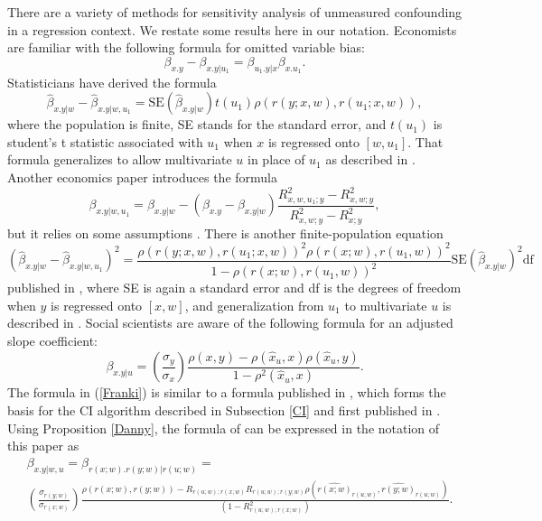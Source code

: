\documentclass[11pt]{amsart}
\begin{document}
There are a variety of methods for sensitivity analysis of unmeasured confounding in a regression context. We restate some results here in our notation. Economists are familiar \citep{Angrist2009} with the following formula for omitted variable bias: \begin{equation}\label{simple}\beta_{x.y}-\beta_{x.y|u_1}=\beta_{u_1.y|x}\beta_{x.u_1}.\end{equation} Statisticians have derived \citep{HHH} the formula \begin{equation}\label{Heq}\hat{\beta}_{x.y|w}-\hat{\beta}_{x.y|w,u_1}=\textrm{SE}(\hat{\beta}_{x.y|w})t(u_1)\rho(r(y;x,w),r(u_1;x,w)),\end{equation} where the population is finite, SE stands for the standard error, and $t(u_1)$ is student's t statistic associated with $u_1$ when $x$ is regressed onto $[w,u_1]$. That formula generalizes to allow multivariate $u$ in place of $u_1$ as described in \citep[Section 4]{HHH}. Another economics paper \citep{Oster2017} introduces the formula \begin{equation}\label{Osterresult}\beta_{x.y|w,u_1}=\beta_{x.y|w}-(\beta_{x.y}-\beta_{x.y|w})\frac{R^2_{x,w,u_1;y}-R^2_{x,w;y}}{R^2_{x,w;y}-R^2_{x;y}},\end{equation} but it relies on some assumptions \citep[Section 3.2]{Oster2017}. There is another finite-population equation \begin{equation}\label{Cin}(\hat{\beta}_{x.y|w}-\hat{\beta}_{x.y|w,u_1})^2=\frac{\rho(r(y;x,w),r(u_1;x,w))^2\rho(r(x;w),r(u_1,w))^2}{1-\rho(r(x;w),r(u_1,w))^2}\textrm{SE}(\hat{\beta}_{x.y|w})^2\textrm{df}\end{equation} published in \citep{CH}, where SE is again a standard error and df is the degrees of freedom when $y$ is regressed onto $[x,w]$, and generalization from $u_1$ to multivariate $u$ is described in \citep[Section 4.5]{CH}. Social scientists are aware \citep{Frank} of the following formula for an adjusted slope coefficient: \begin{equation}\label{Franki}\beta_{x.y|u}=\left(\frac{\sigma_y}{\sigma_x}\right)\frac{\rho(x,y)-\rho(\hat{x}_u,x)\rho(\hat{x}_u,y)}{1-\rho^2(\hat{x}_u,x)}.\end{equation} 
The formula in (\ref{Franki}) is similar to a formula published in \citep{KD}, which forms the basis for the CI algorithm described in Subsection \ref{CI} and first published in \citep{KOA}. Using Proposition \ref{Danny}, the formula of \citep{KD} can be expressed in the notation of this paper as 
\begin{align}
\label{form}
&\beta_{x.y|w,u}=\beta_{r(x;w).r(y;w)|r(u;w)}=\\
&\nonumber\left(\frac{\sigma_{r(y;w)}}{\sigma_{r(x;w)}}\right)\frac{\rho(r(x;w),r(y;w))-R_{r(u;w);r(x;w)}R_{r(u;w);r(y;w)}\rho\left(\hat{r(x;w)}_{r(u;w)},\hat{r(y;w)}_{r(u;w)}\right)}{\left(1-R_{r(u;w);r(x;w)}^2\right)}.
\end{align}
\end{document}
